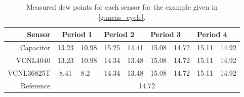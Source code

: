 \begin{table}[]
    \begin{tabular}{|r|clllllll|}
    \hline
    Sensor     & \multicolumn{2}{c|}{Period 1}                           & \multicolumn{2}{l|}{Period 2}                           & \multicolumn{2}{l|}{Period 3}                           & \multicolumn{2}{l|}{Period 4}      \\ \hline
    Capacitor  & \multicolumn{1}{c|}{13.23} & \multicolumn{1}{l|}{10.98} & \multicolumn{1}{l|}{15.25} & \multicolumn{1}{l|}{14.41} & \multicolumn{1}{l|}{15.08} & \multicolumn{1}{l|}{14.72} & \multicolumn{1}{l|}{15.11} & 14.92 \\ \hline
    VCNL4040   & \multicolumn{1}{c|}{13.23} & \multicolumn{1}{l|}{10.98} & \multicolumn{1}{l|}{14.34} & \multicolumn{1}{l|}{13.48} & \multicolumn{1}{l|}{15.08} & \multicolumn{1}{l|}{14.72} & \multicolumn{1}{l|}{15.11} & 14.92 \\ \hline
    VCNL36825T & \multicolumn{1}{c|}{8.41}  & \multicolumn{1}{l|}{8.2}   & \multicolumn{1}{l|}{14.34} & \multicolumn{1}{l|}{13.48} & \multicolumn{1}{l|}{15.08} & \multicolumn{1}{l|}{14.72} & \multicolumn{1}{l|}{15.11} & 14.92 \\ \hline
    Reference  & \multicolumn{8}{c|}{14.72}                                                                                                                                                                                       \\ \hline
    \end{tabular}
    \label{t:dew_points}
    \caption{Measured dew points for each sensor for the example given in \cref{g:meas_cycle}.}
    \end{table}


